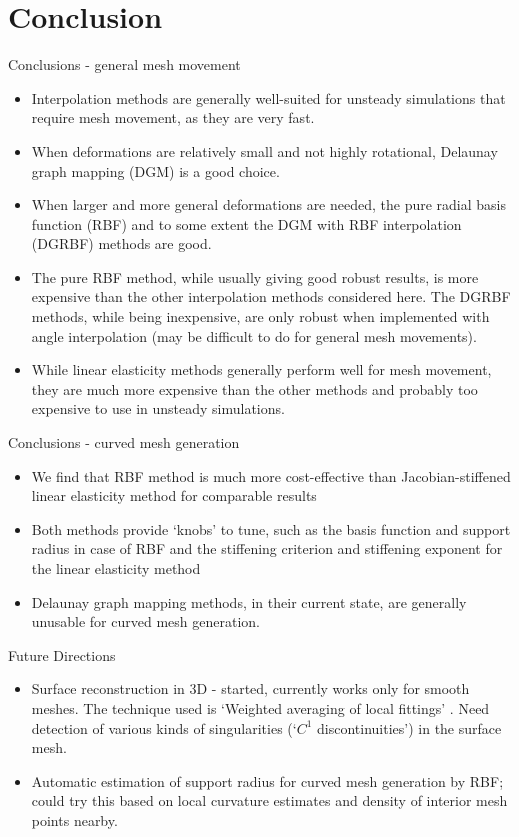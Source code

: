 \documentclass[t,12pt]{beamer}
\begin{document}
\section{Conclusion}
\begin{frame}[allowframebreaks]{Conclusions - general mesh movement}
\begin{itemize}
\item Interpolation methods are generally well-suited for unsteady simulations that require mesh movement, as they are very fast.
\item When deformations are relatively small and not highly rotational, Delaunay graph mapping (DGM) is a good choice.
\item When larger and more general deformations are needed, the pure radial basis function (RBF) and to some extent the DGM with RBF interpolation (DGRBF) methods are good. 
\item The pure RBF method, while usually giving good robust results, is more expensive than the other interpolation methods considered here. The DGRBF methods, while being inexpensive, are only robust when implemented with angle interpolation (may be difficult to do for general mesh movements).
\item While linear elasticity methods generally perform well for mesh movement, they are much more expensive than the other methods and probably too expensive to use in unsteady simulations.
\end{itemize}
\end{frame}
\begin{frame}{Conclusions - curved mesh generation}
\begin{itemize}
	\item We find that RBF method is much more cost-effective than Jacobian-stiffened linear elasticity method for comparable results
	\item Both methods provide `knobs' to tune, such as the basis function and support radius in case of RBF and the stiffening criterion and stiffening exponent for the linear elasticity method
	\item Delaunay graph mapping methods, in their current state, are generally unusable for curved mesh generation.
\end{itemize}
\end{frame}
\begin{frame}{Future Directions}
\begin{itemize}
	\item Surface reconstruction in 3D - started, currently works only for smooth meshes. The technique used is `Weighted averaging of local fittings' . 
	Need detection of various kinds of singularities (`$C^1$ discontinuities') in the surface mesh.
	\item Automatic estimation of support radius for curved mesh generation by RBF; could try this based on local curvature estimates and density of interior mesh points nearby.
\end{itemize}
\end{frame}
\printbibliography
\end{document}
